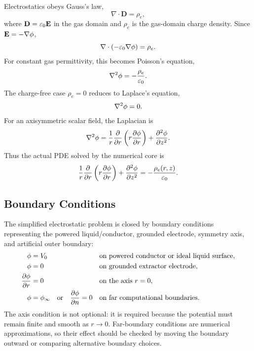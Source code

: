 Electrostatics obeys Gauss's law,
\begin{equation}
    \nabla\cdot\mathbf{D}=\rho_e,
\end{equation}
where $\mathbf{D}=\varepsilon_0 \mathbf{E}$ in the gas domain and $\rho_e$ is the gas-domain charge density. Since $\mathbf{E}=-\nabla\phi$,
\begin{equation}
    \nabla\cdot(-\varepsilon_0\nabla\phi)=\rho_e.
\end{equation}
For constant gas permittivity, this becomes Poisson's equation,
\begin{equation}
    \nabla^2\phi=-\frac{\rho_e}{\varepsilon_0}.
\end{equation}
The charge-free case $\rho_e=0$ reduces to Laplace's equation,
\begin{equation}
    \nabla^2\phi=0.
\end{equation}
For an axisymmetric scalar field, the Laplacian is
\begin{equation}
\nabla^2 \phi = \frac{1}{r}\frac{\partial}{\partial r}\left(r\frac{\partial \phi}{\partial r}\right)+\frac{\partial^2 \phi}{\partial z^2}.
\label{eq:axisymmetric_laplacian_full}
\end{equation}
Thus the actual PDE solved by the numerical core is
\begin{equation}
    \frac{1}{r}\frac{\partial}{\partial r}\left(r\frac{\partial\phi}{\partial r}\right)
    +\frac{\partial^2\phi}{\partial z^2}
    =-\frac{\rho_e(r,z)}{\varepsilon_0}.
\label{eq:axisymmetric_poisson_full}
\end{equation}

\subsection{Boundary Conditions}

The simplified electrostatic problem is closed by boundary conditions representing the powered liquid/conductor, grounded electrode, symmetry axis, and artificial outer boundary:
\begin{align}
    \phi &= V_0 &&\text{on powered conductor or ideal liquid surface},\\
    \phi &= 0 &&\text{on grounded extractor electrode},\\
    \frac{\partial \phi}{\partial r} &=0 &&\text{on the axis } r=0,\\
    \phi &= \phi_{\infty}\quad\text{or}\quad \frac{\partial\phi}{\partial n}=0
    &&\text{on far computational boundaries}.
\end{align}
The axis condition is not optional: it is required because the potential must remain finite and smooth as $r\rightarrow 0$. Far-boundary conditions are numerical approximations, so their effect should be checked by moving the boundary outward or comparing alternative boundary choices.


